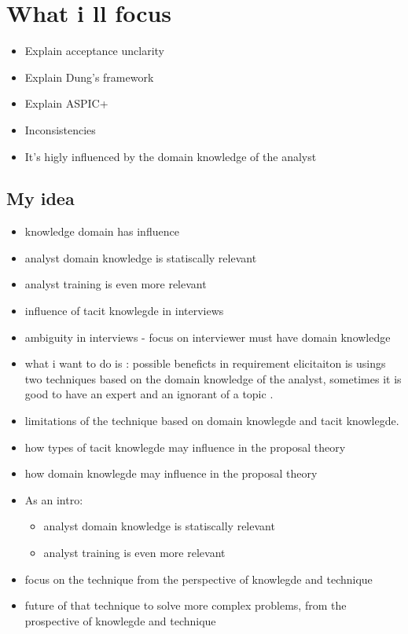 \documentclass[]{llncs}
\begin{document}
\hypertarget{what-i-ll-focus}{%
\section{What i ll focus}\label{what-i-ll-focus}}

\begin{itemize}
\tightlist
\item
  Explain acceptance unclarity
\item
  Explain Dung's framework
\item
  Explain ASPIC+
\item
  Inconsistencies
\item
  It's higly influenced by the domain knowledge of the analyst
\end{itemize}

\hypertarget{my-idea}{%
\subsection{My idea}\label{my-idea}}

\begin{itemize}
\item
  knowledge domain has influence
\item
  analyst domain knowledge is statiscally relevant
\item
  analyst training is even more relevant
\item
  influence of tacit knowlegde in interviews
\item
  ambiguity in interviews - focus on interviewer must have domain
  knowledge
\item
  what i want to do is : possible beneficts in requirement elicitaiton
  is usings two techniques based on the domain knowledge of the analyst,
  sometimes it is good to have an expert and an ignorant of a topic .
\item
  limitations of the technique based on domain knowlegde and tacit
  knowlegde.
\item
  how types of tacit knowlegde may influence in the proposal theory
\item
  how domain knowlegde may influence in the proposal theory
\item
  As an intro:

  \begin{itemize}
  \tightlist
  \item
    analyst domain knowledge is statiscally relevant
  \item
    analyst training is even more relevant
  \end{itemize}
\item
  focus on the technique from the perspective of knowlegde and technique
\item
  future of that technique to solve more complex problems, from the
  prospective of knowlegde and technique
\end{itemize}
\end{document}
